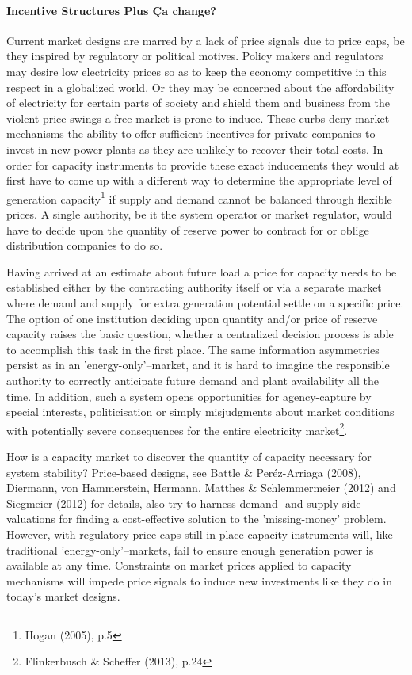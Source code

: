 \documentclass[11pt,a4paper,english]{scrreprt}
\begin{document}
    \paragraph{Incentive Structures \textemdash{} Plus \c{C}a change?}
\par
Current market designs are marred by a lack of price signals due to price
caps, be they inspired by regulatory or political motives. Policy makers and
regulators may desire low electricity prices so as to keep the economy
competitive in this respect in a globalized world. Or they may be concerned
about the affordability of electricity for certain parts of society and shield
them and business from the violent price swings a free market is prone to
induce. These curbs deny market mechanisms the ability to offer sufficient
incentives for private companies to invest in new power plants as they are
unlikely to recover their total costs. In order for capacity instruments to
provide these exact inducements they would at first have to come up with a
different way to determine the appropriate level of generation
capacity\footnote{Hogan (2005), p.5} if supply and demand cannot be balanced
through flexible prices. A single authority, be it the system operator or market
regulator, would have to decide upon the quantity of reserve power to contract
for or oblige distribution companies to do so.\par
   

Having arrived at an estimate about future load a price for capacity
needs to be established either by the contracting authority itself or via a
separate market where demand and supply for extra generation potential settle
on a specific price. The option of one institution deciding upon quantity and/or
price of reserve capacity raises the basic question, whether a centralized
decision process is able to accomplish this task in the first place. The same
information asymmetries persist as in an 'energy-only'--market, and it is hard
to imagine the responsible authority to correctly anticipate future demand and
plant availability all the time. In addition, such a system opens
opportunities for agency-capture by special interests, politicisation
or simply misjudgments about market conditions with potentially severe
consequences for the entire electricity market\footnote{Flinkerbusch \&
Scheffer (2013), p.24}.\par
 

How is a capacity market to discover the quantity of capacity necessary for
system stability? Price-based designs, see Battle \& Per\'{e}z-Arriaga (2008),
Diermann, von Hammerstein, Hermann, Matthes \& Schlemmermeier (2012) and
Siegmeier (2012) for details, also try to harness demand- and supply-side
valuations for finding a cost-effective solution to the 'missing-money' problem.
However, with regulatory price caps still in place capacity instruments will,
like traditional 'energy-only'--markets, fail to ensure enough generation power
is available at any time. Constraints on market prices applied to capacity
mechanisms will impede price signals to induce new investments like they do in
today's market designs.\par
\end{document}
